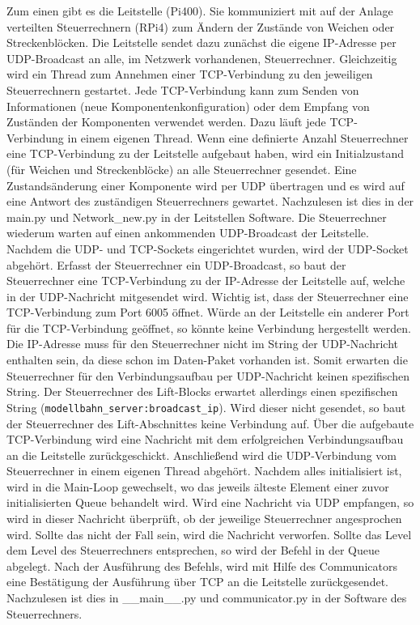 \documentclass{article}
\begin{document}
Zum einen gibt es die Leitstelle (Pi400).
Sie kommuniziert mit auf der Anlage verteilten Steuerrechnern (RPi4) zum Ändern der Zustände von Weichen oder Streckenblöcken.
Die Leitstelle sendet dazu zunächst die eigene IP-Adresse per UDP-Broadcast an alle, im Netzwerk vorhandenen, Steuerrechner.
Gleichzeitig wird ein Thread zum Annehmen einer TCP-Verbindung zu den jeweiligen Steuerrechnern gestartet.
Jede TCP-Verbindung kann zum Senden von Informationen (neue Komponentenkonfiguration) oder dem Empfang von Zuständen der Komponenten verwendet werden.
Dazu läuft jede TCP-Verbindung in einem eigenen Thread. Wenn eine definierte Anzahl Steuerrechner eine TCP-Verbindung zu der Leitstelle aufgebaut haben, wird ein Initialzustand (für Weichen und Streckenblöcke) an alle Steuerrechner gesendet.
Eine Zustandsänderung einer Komponente wird per UDP übertragen und es wird auf eine Antwort des zuständigen Steuerrechners gewartet.
Nachzulesen ist dies in der main.py und Network\_new.py in der Leitstellen Software.
Die Steuerrechner wiederum warten auf einen ankommenden UDP-Broadcast der Leitstelle.
Nachdem die UDP- und TCP-Sockets eingerichtet wurden, wird der UDP-Socket abgehört.
Erfasst der Steuerrechner ein UDP-Broadcast, so baut der Steuerrechner eine TCP-Verbindung zu der IP-Adresse der Leitstelle auf, welche in der UDP-Nachricht mitgesendet wird.
Wichtig ist, dass der Steuerrechner eine TCP-Verbindung zum Port 6005 öffnet.
Würde an der Leitstelle ein anderer Port für die TCP-Verbindung geöffnet, so könnte keine Verbindung hergestellt werden.
Die IP-Adresse muss für den Steuerrechner nicht im String der UDP-Nachricht enthalten sein, da diese schon im Daten-Paket vorhanden ist.
Somit erwarten die Steuerrechner für den Verbindungsaufbau per UDP-Nachricht keinen spezifischen String.
Der Steuerrechner des Lift-Blocks erwartet allerdings einen spezifischen String (\texttt{modellbahn\_server:broadcast\_ip}).
Wird dieser nicht gesendet, so baut der Steuerrechner des Lift-Abschnittes keine Verbindung auf.
Über die aufgebaute TCP-Verbindung wird eine Nachricht mit dem erfolgreichen Verbindungsaufbau an die Leitstelle zurückgeschickt.
Anschließend wird die UDP-Verbindung vom Steuerrechner in einem eigenen Thread abgehört.
Nachdem alles initialisiert ist, wird in die Main-Loop gewechselt, wo das jeweils älteste Element einer zuvor initialisierten Queue behandelt wird.
Wird eine Nachricht via UDP empfangen, so wird in dieser Nachricht überprüft, ob der jeweilige Steuerrechner angesprochen wird.
Sollte das nicht der Fall sein, wird die Nachricht verworfen.
Sollte das Level dem Level des Steuerrechners entsprechen, so wird der Befehl in der Queue abgelegt.
Nach der Ausführung des Befehls, wird mit Hilfe des Communicators eine Bestätigung der Ausführung über TCP an die Leitstelle zurückgesendet.
Nachzulesen ist dies in \_\_main\_\_.py und communicator.py in der Software des Steuerrechners.
\end{document}
